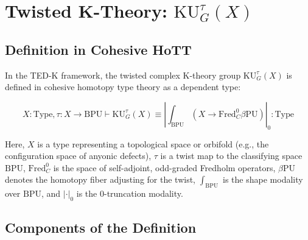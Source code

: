 \documentclass{article}
\theoremstyle{definition}
\begin{document}
\section{Twisted K-Theory: \(\mathrm{KU}^\tau_G(X)\)}

\subsection{Definition in Cohesive HoTT}

In the TED-K framework, the twisted complex K-theory group \(\mathrm{KU}^\tau_G(X)\) is defined in cohesive homotopy type theory as a dependent type:

\begin{equation}
X: \text{Type}, \tau: X \to \mathrm{BPU} \vdash \mathrm{KU}^\tau_G(X) \equiv \left| \int_{\mathrm{BPU}} \left( X \to \text{Fred}_C^0 \beta \mathrm{PU} \right) \right|_0 : \text{Type}
\end{equation}

Here, \(X\) is a type representing a topological space or orbifold (e.g., the configuration space of anyonic defects), \(\tau\) is a twist map to the classifying space \(\mathrm{BPU}\), \(\text{Fred}_C^0\) is the space of self-adjoint, odd-graded Fredholm operators, \(\beta \mathrm{PU}\) denotes the homotopy fiber adjusting for the twist, \(\int_{\mathrm{BPU}}\) is the shape modality over \(\mathrm{BPU}\), and \(|\cdot|_0\) is the 0-truncation modality.

\subsection{Components of the Definition}
\end{document}
